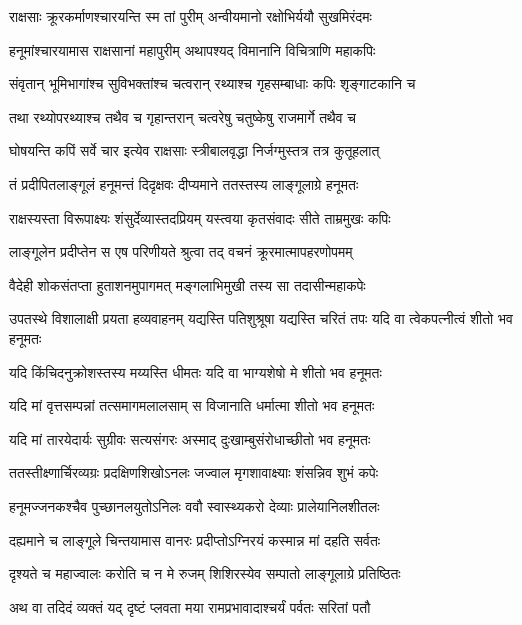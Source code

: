 \twolineshloka
{राक्षसाः क्रूरकर्माणश्चारयन्ति स्म तां पुरीम्}
{अन्वीयमानो रक्षोभिर्ययौ सुखमिरंदमः} %

\twolineshloka
{हनूमांश्चारयामास राक्षसानां महापुरीम्}
{अथापश्यद् विमानानि विचित्राणि महाकपिः} %

\twolineshloka
{संवृतान् भूमिभागांश्च सुविभक्तांश्च चत्वरान्}
{रथ्याश्च गृहसम्बाधाः कपिः शृङ्गाटकानि च} %

\twolineshloka
{तथा रथ्योपरथ्याश्च तथैव च गृहान्तरान्}
{चत्वरेषु चतुष्केषु राजमार्गे तथैव च} %

\twolineshloka
{घोषयन्ति कपिं सर्वे चार इत्येव राक्षसाः}
{स्त्रीबालवृद्धा निर्जग्मुस्तत्र तत्र कुतूहलात्} %

\twolineshloka
{तं प्रदीपितलाङ्गूलं हनूमन्तं दिदृक्षवः}
{दीप्यमाने ततस्तस्य लाङ्गूलाग्रे हनूमतः} %

\twolineshloka
{राक्षस्यस्ता विरूपाक्ष्यः शंसुर्देव्यास्तदप्रियम्}
{यस्त्वया कृतसंवादः सीते ताम्रमुखः कपिः} %

\twolineshloka
{लाङ्गूलेन प्रदीप्तेन स एष परिणीयते}
{श्रुत्वा तद् वचनं क्रूरमात्मापहरणोपमम्} %

\twolineshloka
{वैदेही शोकसंतप्ता हुताशनमुपागमत्}
{मङ्गलाभिमुखी तस्य सा तदासीन्महाकपेः} %

\threelineshloka
{उपतस्थे विशालाक्षी प्रयता हव्यवाहनम्}
{यद्यस्ति पतिशुश्रूषा यद्यस्ति चरितं तपः}
{यदि वा त्वेकपत्नीत्वं शीतो भव हनूमतः} %

\twolineshloka
{यदि किंचिदनुक्रोशस्तस्य मय्यस्ति धीमतः}
{यदि वा भाग्यशेषो मे शीतो भव हनूमतः} %

\twolineshloka
{यदि मां वृत्तसम्पन्नां तत्समागमलालसाम्}
{स विजानाति धर्मात्मा शीतो भव हनूमतः} %

\twolineshloka
{यदि मां तारयेदार्यः सुग्रीवः सत्यसंगरः}
{अस्माद् दुःखाम्बुसंरोधाच्छीतो भव हनूमतः} %

\twolineshloka
{ततस्तीक्ष्णार्चिरव्यग्रः प्रदक्षिणशिखोऽनलः}
{जज्वाल मृगशावाक्ष्याः शंसन्निव शुभं कपेः} %

\twolineshloka
{हनूमज्जनकश्चैव पुच्छानलयुतोऽनिलः}
{ववौ स्वास्थ्यकरो देव्याः प्रालेयानिलशीतलः} %

\twolineshloka
{दह्यमाने च लाङ्गूले चिन्तयामास वानरः}
{प्रदीप्तोऽग्निरयं कस्मान्न मां दहति सर्वतः} %

\twolineshloka
{दृश्यते च महाज्वालः करोति च न मे रुजम्}
{शिशिरस्येव सम्पातो लाङ्गूलाग्रे प्रतिष्ठितः} %

\twolineshloka
{अथ वा तदिदं व्यक्तं यद् दृष्टं प्लवता मया}
{रामप्रभावादाश्चर्यं पर्वतः सरितां पतौ} %

